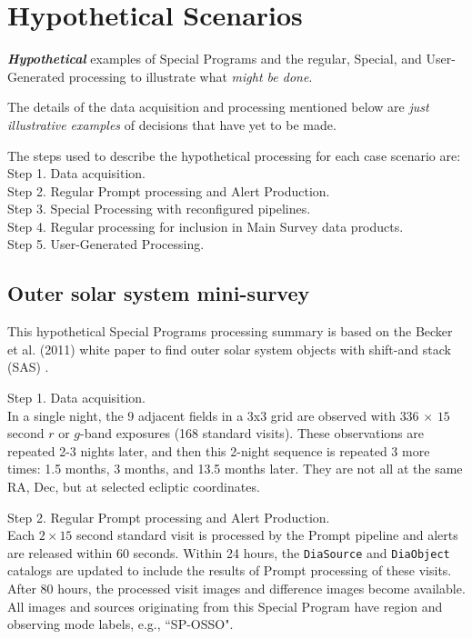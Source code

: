 \section{Hypothetical Scenarios}\label{sec:spcs}

\textbf{\emph{Hypothetical}} examples of Special Programs
and the regular, Special, and User-Generated processing
to illustrate what \emph{might be done}.

The details of the data acquisition and processing mentioned below are 
\emph{just illustrative examples} of decisions that have yet to be made.

The steps used to describe the hypothetical processing for each case scenario are: \\
Step 1. Data acquisition. \\
Step 2. Regular Prompt processing and Alert Production. \\
Step 3. Special Processing with reconfigured pipelines. \\
Step 4. Regular processing for inclusion in Main Survey data products. \\
Step 5. User-Generated Processing. \\

\subsection{Outer solar system mini-survey}\label{ssec:SPCS_TNO}

This hypothetical Special Programs processing summary is based on the Becker et al. (2011) 
white paper to find outer solar system objects with shift-and stack (SAS) .

Step 1. Data acquisition. \\
In a single night, the 9 adjacent fields in a 3x3 grid are observed with 
$336$ $\times$ $15$ second $r$ or $g$-band exposures (168 standard visits). 
These observations are repeated 2-3 nights later, and then this 2-night sequence
is repeated 3 more times: 1.5 months, 3 months, and 13.5 months later. 
They are not all at the same RA, Dec, but at selected ecliptic coordinates.

Step 2. Regular Prompt processing and Alert Production. \\
Each $2\times15$ second standard visit is processed by the Prompt pipeline 
and alerts are released within 60 seconds.
Within 24 hours, the {\tt DiaSource} and {\tt DiaObject} catalogs are updated
to include the results of Prompt processing of these visits.
After 80 hours, the processed visit images and difference images become available.
All images and sources originating from this Special Program have 
region and observing mode labels, e.g., ``SP-OSSO".


